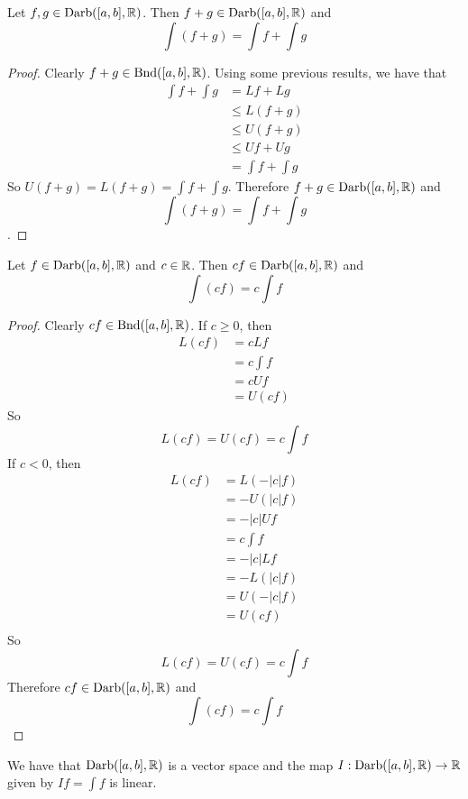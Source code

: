 \documentclass{book}
\begin{document}
	\begin{ex}  
		Let $f, g \in \text{Darb}([a,b], \mathbb{R})$. Then $f+g \in \text{Darb}([a,b], \mathbb{R})$ and $$\int (f+g) = \int f + \int g$$
	\end{ex}
	
	\begin{proof}
		Clearly $f+g \in \text{Bnd}([a,b], \mathbb{R})$. Using some previous results, we have that 
		\begin{align*}
			\int f + \int g 
			&= Lf + Lg \\
			&\leq L(f+g) \\
			&\leq U(f+g) \\
			&\leq Uf + Ug \\
			&= \int f + \int g
		\end{align*}
		So $U(f+g) = L(f+g) = \int f + \int g$. Therefore $f+g \in \text{Darb}([a,b], \mathbb{R})$ and $$\int (f+g) = \int f + \int g$$.
	\end{proof}
	
	\begin{ex}  
		Let $f \in \text{Darb}([a,b], \mathbb{R})$ and $c \in \mathbb{R}$. Then $cf \in \text{Darb}([a,b], \mathbb{R})$ and $$\int (cf) = c \int f $$
	\end{ex}
	
	\begin{proof}
		Clearly $cf \in \text{Bnd}([a,b], \mathbb{R})$. If $c \geq 0$, then 
		\begin{align*}
			L (cf) 
			&= c Lf \\
			&= c \int f \\
			&= c Uf \\
			&= U(cf)
		\end{align*} 
		So $$L(cf) = U(cf) = c \int f$$ If $c <0$, then 
		\begin{align*}
			L (cf) 
			&= L(-|c| f) \\
			&= -U(|c|f) \\
			&= - |c|Uf \\
			&= c \int f \\
			&= -|c| L f \\
			&= - L(|c|f) \\
			&= U(-|c|f) \\
			&= U (c f) \\
		\end{align*} 
		So $$L(cf) = U(cf) = c \int f$$ Therefore $cf \in \text{Darb}([a,b], \mathbb{R})$ and $$\int (cf) = c \int f$$
	\end{proof}
	
	\begin{cor}
		We have that $\text{Darb}([a,b], \mathbb{R})$ is a vector space and the map $I: \text{Darb}([a,b], \mathbb{R}) \rightarrow \mathbb{R}$ given by $If = \int f$ is linear.
	\end{cor}
	
\end{document}
